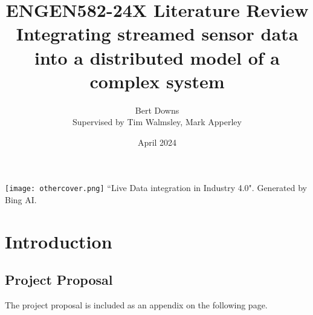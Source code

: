 \documentclass[12pt]{article}
\title{ENGEN582-24X Literature Review \\
\large{Integrating streamed sensor data into a distributed model of a complex system}}
\author{Bert Downs  \\ 
Supervised by Tim Walmsley, Mark Apperley }
\date{April 2024}
\begin{document}
\maketitle

\begin{center}
    \texttt{[image: othercover.png]}
    ``Live Data integration in Industry 4.0". Generated by Bing AI.
\end{center}
\newpage
\tableofcontents


    

\newpage




\section{Introduction}




\begin{appendices}

\section{Project Proposal} \label{sec:proposal}
The project proposal is included as an appendix on the following page.


% 

%     
\end{appendices}
\end{document}
